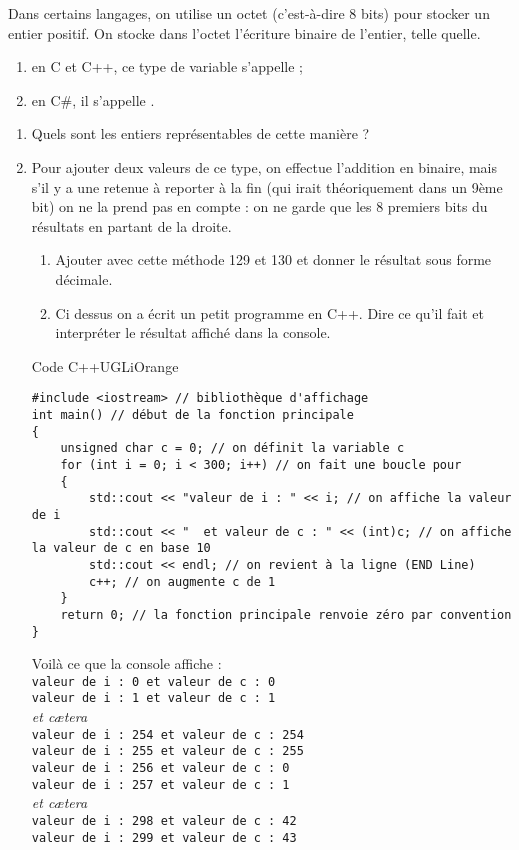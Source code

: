 \documentclass[a4paper,10pt]{book}
\begin{document}
Dans certains langages, on utilise un octet (c'est-à-dire 8 bits) pour stocker un entier positif. On stocke dans l'octet l'écriture binaire de l'entier, telle quelle.
\begin{enumerate}[--]
	\item 	en C et C++, ce type de variable s'appelle ;
	\item 	en C\#, il s'appelle .
\end{enumerate}
\begin{enumerate}[\bfseries 1.]
	\item 	Quels sont les entiers représentables de cette manière ?
	\item 	Pour ajouter deux valeurs de ce type, on effectue l'addition en binaire, mais s'il y a une retenue à reporter à la fin (qui irait théoriquement dans un 9ème bit) on ne la prend pas en compte : on ne garde que les 8 premiers bits du résultats en partant de la droite.
	\begin{enumerate}[\bfseries a.]
		\item 	Ajouter avec cette méthode 129 et 130 et donner le résultat sous forme décimale.
		\item	Ci dessus on a écrit un petit programme en C++. Dire ce qu'il fait et interpréter le résultat affiché dans la console.
	\end{enumerate}
\begin{encadrecolore}{Code C++}{UGLiOrange}
\begin{verbatim}
#include <iostream> // bibliothèque d'affichage
int main() // début de la fonction principale
{
    unsigned char c = 0; // on définit la variable c
    for (int i = 0; i < 300; i++) // on fait une boucle pour
    {
        std::cout << "valeur de i : " << i; // on affiche la valeur de i
        std::cout << "  et valeur de c : " << (int)c; // on affiche la valeur de c en base 10
        std::cout << endl; // on revient à la ligne (END Line)
        c++; // on augmente c de 1
    }
    return 0; // la fonction principale renvoie zéro par convention
}
\end{verbatim}
\end{encadrecolore}
Voilà ce que la console affiche :\\

\texttt{valeur de i : 0  et valeur de c : 0}\\
\texttt{valeur de i : 1  et valeur de c : 1}\\
\textit{et c\ae tera}\\
\texttt{valeur de i : 254  et valeur de c : 254}\\
\texttt{valeur de i : 255  et valeur de c : 255}\\
\texttt{valeur de i : 256  et valeur de c : 0}\\
\texttt{valeur de i : 257  et valeur de c : 1}\\
\textit{et c\ae tera}\\
\texttt{valeur de i : 298  et valeur de c : 42}\\
\texttt{valeur de i : 299  et valeur de c : 43}\\

\end{enumerate}
\end{document}
